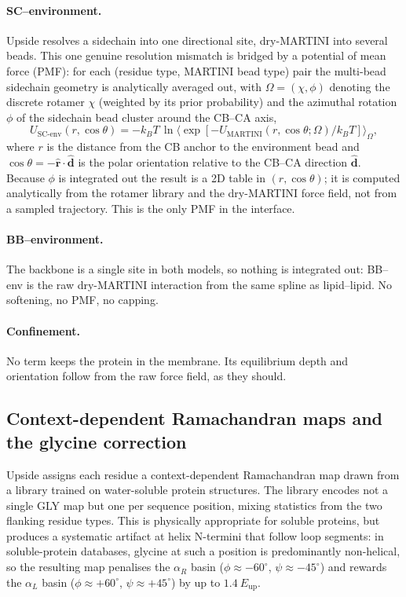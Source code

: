\documentclass[journal=jctcce,manuscript=article,layout=twocolumn]{achemso}
\begin{document}
\paragraph{SC--environment.} Upside resolves a sidechain into one directional site,
dry-MARTINI into several beads. This one genuine resolution mismatch is bridged by a
potential of mean force (PMF): for each (residue type, MARTINI bead type) pair the
multi-bead sidechain geometry is analytically averaged out, with
$\Omega=(\chi,\phi)$ denoting the discrete rotamer $\chi$ (weighted by its prior
probability) and the azimuthal rotation $\phi$ of the sidechain bead cluster around
the CB--CA axis,
\begin{equation}
U_\mathrm{SC\text{-}env}(r,\cos\theta) = -k_BT\,\ln\Big\langle
  \exp[-U_\mathrm{MARTINI}(r,\cos\theta;\Omega)/k_BT]\Big\rangle_{\Omega},
\end{equation}
where $r$ is the distance from the CB anchor to the environment bead and
$\cos\theta=-\hat{\mathbf{r}}\cdot\hat{\mathbf{d}}$ is the polar orientation relative
to the CB--CA direction $\hat{\mathbf{d}}$. Because $\phi$ is integrated out the
result is a 2D table in $(r,\cos\theta)$; it is computed analytically from the rotamer
library and the dry-MARTINI force field, not from a sampled trajectory. This is the
only PMF in the interface.

\paragraph{BB--environment.} The backbone is a single site in both models, so nothing
is integrated out: BB--env is the raw dry-MARTINI interaction from the same spline as
lipid--lipid. No softening, no PMF, no capping.

\paragraph{Confinement.} No term keeps the protein in the membrane. Its equilibrium
depth and orientation follow from the raw force field, as they should.

\subsection{Context-dependent Ramachandran maps and the glycine correction}
\label{sec:gly}

Upside assigns each residue a context-dependent Ramachandran map drawn from
a library trained on water-soluble protein structures. The library encodes
not a single GLY map but one per sequence position, mixing statistics from
the two flanking residue types. This is physically appropriate for soluble
proteins, but produces a systematic artifact at helix N-termini that follow
loop segments: in soluble-protein databases, glycine at such a position is
predominantly non-helical, so the resulting map penalises the $\alpha_R$
basin ($\phi\approx-60^{\circ}$, $\psi\approx-45^{\circ}$) and rewards the
$\alpha_L$ basin ($\phi\approx+60^{\circ}$, $\psi\approx+45^{\circ}$) by
up to $1.4~E_\mathrm{up}$.
\end{document}
